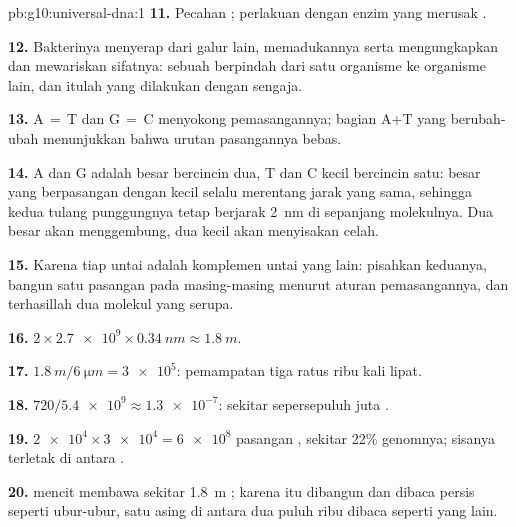 \begin{solution}{pb:g10:universal-dna:1}
\textbf{11.} Pecahan ; perlakuan dengan enzim yang merusak .

\textbf{12.} Bakterinya menyerap  dari galur lain, memadukannya
serta mengungkapkan dan mewariskan sifatnya: sebuah  berpindah dari
satu organisme ke organisme lain, dan itulah yang dilakukan
 dengan sengaja.

\textbf{13.} A$\,=\,$T dan G$\,=\,$C menyokong pemasangannya; bagian
A+T yang berubah-ubah menunjukkan bahwa urutan pasangannya bebas.

\textbf{14.} A dan G adalah  besar bercincin dua, T dan C 
kecil bercincin satu:  besar yang berpasangan dengan  kecil
selalu merentang jarak yang sama, sehingga kedua tulang punggungnya
tetap berjarak \qty{2}{nm} di sepanjang molekulnya. Dua  besar akan
menggembung, dua  kecil akan menyisakan celah.

\textbf{15.} Karena tiap untai adalah komplemen untai yang lain:
pisahkan keduanya, bangun satu pasangan pada masing-masing menurut
aturan pemasangannya, dan terhasillah dua molekul yang serupa.

\textbf{16.} $2 \times \num{2.7e9} \times \qty{0.34}{nm} \approx
\qty{1.8}{m}$.

\textbf{17.} $\qty{1.8}{m} / \qty{6}{\micro m} = \num{3e5}$:
pemampatan tiga ratus ribu kali lipat.

\textbf{18.} $720 / \num{5.4e9} \approx \num{1.3e-7}$: sekitar
sepersepuluh juta  .

\textbf{19.} $\num{2e4} \times \num{3e4} = \num{6e8}$ pasangan ,
sekitar 22\% genomnya; sisanya terletak di antara .

\textbf{20.}  mencit membawa sekitar \qty{1.8}{m} ; karena 
itu dibangun dan dibaca persis seperti  ubur-ubur, satu  asing di
antara dua puluh ribu  dibaca seperti  yang lain.
\end{solution}
